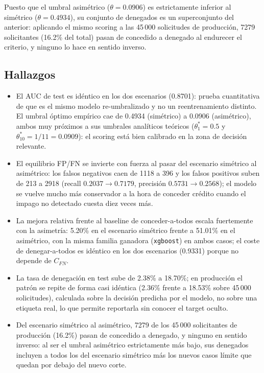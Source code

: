 \documentclass[11pt,a4paper]{article}
\begin{document}
Puesto que el umbral asimétrico ($\theta=0.0906$) es estrictamente inferior al simétrico
($\theta=0.4934$), su conjunto de denegados es un superconjunto del anterior: aplicando el mismo scoring
a las 45\,000 solicitudes de producción, 7279 solicitantes (16.2\% del total) pasan de concedido a
denegado al endurecer el criterio, y ninguno lo hace en sentido inverso.

\subsection*{Hallazgos}

\begin{itemize}
\item El AUC de test es idéntico en los dos escenarios (0.8701): prueba cuantitativa de que es el mismo
modelo re-umbralizado y no un reentrenamiento distinto. El umbral óptimo empírico cae de 0.4934
(simétrico) a 0.0906 (asimétrico), ambos muy próximos a sus umbrales analíticos teóricos
($\theta^{*}_{1}=0.5$ y $\theta^{*}_{10}=1/11=0.0909$): el scoring está bien calibrado en la zona de
decisión relevante.
\item El equilibrio FP/FN se invierte con fuerza al pasar del escenario simétrico al asimétrico: los
falsos negativos caen de 1118 a 396 y los falsos positivos suben de 213 a 2918 (recall
$0.2037\rightarrow 0.7179$, precisión $0.5731\rightarrow 0.2568$); el modelo se vuelve mucho más
conservador a la hora de conceder crédito cuando el impago no detectado cuesta diez veces más.
\item La mejora relativa frente al baseline de conceder-a-todos escala fuertemente con la asimetría:
5.20\% en el escenario simétrico frente a 51.01\% en el asimétrico, con la misma familia ganadora
(\texttt{xgboost}) en ambos casos; el coste de denegar-a-todos es idéntico en los dos escenarios
(0.9331) porque no depende de $C_{FN}$.
\item La tasa de denegación en test sube de 2.38\% a 18.70\%; en producción el patrón se repite de forma
casi idéntica (2.36\% frente a 18.53\% sobre 45\,000 solicitudes), calculada sobre la decisión predicha
por el modelo, no sobre una etiqueta real, lo que permite reportarla sin conocer el target oculto.
\item Del escenario simétrico al asimétrico, 7279 de los 45\,000 solicitantes de producción (16.2\%)
pasan de concedido a denegado, y ninguno en sentido inverso: al ser el umbral asimétrico estrictamente
más bajo, sus denegados incluyen a todos los del escenario simétrico más los nuevos casos límite que
quedan por debajo del nuevo corte.
\end{itemize}
\end{document}
